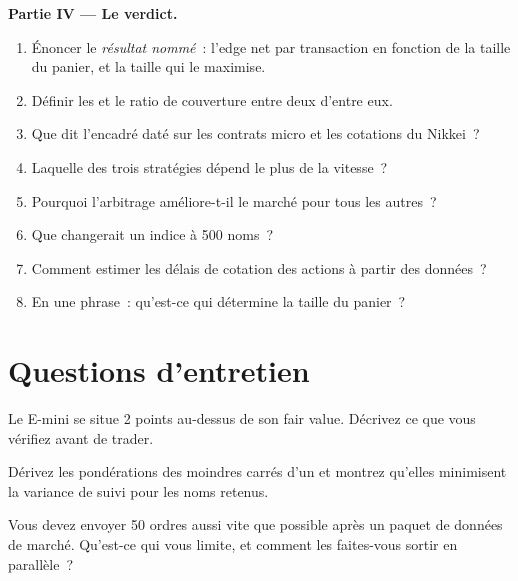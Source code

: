 \begin{problem}
\medskip\noindent\textbf{Partie IV --- Le verdict.}
\begin{enumerate}[resume]
\item Énoncer le \emph{résultat nommé}~: l'edge net par transaction en fonction de la taille du panier, et la taille qui le maximise.
\item Définir les  et le ratio de couverture entre deux d'entre eux.
\item Que dit l'encadré daté sur les contrats micro et les cotations du Nikkei~?
\item Laquelle des trois stratégies dépend le plus de la vitesse~?
\item Pourquoi l'arbitrage améliore-t-il le marché pour tous les autres~?
\item Que changerait un indice à 500 noms~?
\item Comment estimer les délais de cotation des actions à partir des données~?
\item En une phrase~: qu'est-ce qui détermine la taille du panier~?
\end{enumerate}
\end{problem}

\section{Questions d'entretien}

\begin{interviewq}\label{iq:hf:index-and-basket-arbitrage:1}
Le E-mini se situe 2 points au-dessus de son fair value. Décrivez ce que vous vérifiez avant de trader.
\end{interviewq}

\begin{interviewq}\label{iq:hf:index-and-basket-arbitrage:2}
Dérivez les pondérations des moindres carrés d'un  et montrez qu'elles minimisent la variance de suivi pour les noms retenus.
\end{interviewq}

\begin{interviewq}\label{iq:hf:index-and-basket-arbitrage:3}
Vous devez envoyer 50 ordres aussi vite que possible après un paquet de données de marché. Qu'est-ce qui vous limite, et comment les faites-vous sortir en parallèle~?
\end{interviewq}

